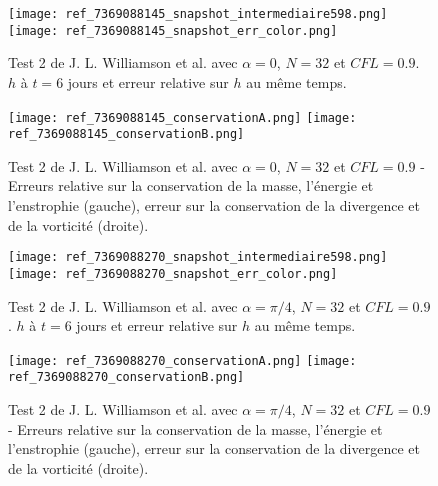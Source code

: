 \begin{figure}[ht]
\begin{center}
\texttt{[image: ref\_7369088145\_snapshot\_intermediaire598.png]}\\
\texttt{[image: ref\_7369088145\_snapshot\_err\_color.png]}
\end{center}
\caption{Test 2 de J. L. Williamson et al. \cite{Williamson1992} avec $\alpha=0$, $N=32$ et $CFL=0.9$. $h$ à $t=6$ jours et erreur relative sur $h$ au même temps.}
\label{fig: williamson 2 space alpha=0}
\end{figure}

\begin{figure}[ht]
\begin{center}
\texttt{[image: ref\_7369088145\_conservationA.png]}
\texttt{[image: ref\_7369088145\_conservationB.png]}
\end{center}
\caption{Test 2 de J. L. Williamson et al. \cite{Williamson1992} avec $\alpha=0$, $N=32$ et $CFL=0.9$ - Erreurs relative sur la conservation de la masse, l'énergie et l'enstrophie (gauche), erreur sur la conservation de la divergence et de la vorticité (droite).}
\label{fig: williamson 2 conservation alpha=0}
\end{figure}




\begin{figure}[ht]
\begin{center}
\texttt{[image: ref\_7369088270\_snapshot\_intermediaire598.png]}\\
\texttt{[image: ref\_7369088270\_snapshot\_err\_color.png]}
\end{center}
\caption{Test 2 de J. L. Williamson et al. \cite{Williamson1992} avec $\alpha=\pi/4$, $N=32$ et $CFL=0.9$. $h$ à $t=6$ jours et erreur relative sur $h$ au même temps.}
\label{fig: williamson 2 space alpha=pi/4}
\end{figure}

\begin{figure}[ht]
\begin{center}
\texttt{[image: ref\_7369088270\_conservationA.png]}
\texttt{[image: ref\_7369088270\_conservationB.png]}
\end{center}
\caption{Test 2 de J. L. Williamson et al. \cite{Williamson1992} avec $\alpha=\pi/4$, $N=32$ et $CFL=0.9$ - Erreurs relative sur la conservation de la masse, l'énergie et l'enstrophie (gauche), erreur sur la conservation de la divergence et de la vorticité (droite).}
\label{fig: williamson 2 conservation alpha=pi/4}
\end{figure}

